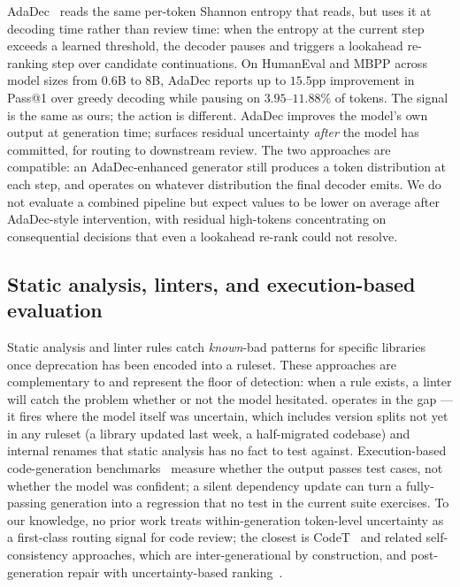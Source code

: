 AdaDec~\cite{adadec2025} reads the same per-token Shannon entropy that
\eps reads, but uses it at decoding time rather than review time: when
the entropy at the current step exceeds a learned threshold, the decoder
pauses and triggers a lookahead re-ranking step over candidate
continuations. On HumanEval and MBPP across model sizes from $0.6$B to
$8$B, AdaDec reports up to $15.5$pp improvement in Pass@1 over greedy
decoding while pausing on $3.95$--$11.88\%$ of tokens. The signal is the
same as ours; the action is different. AdaDec improves the model's own
output at generation time; \eps surfaces residual uncertainty \emph{after}
the model has committed, for routing to downstream review. The two
approaches are compatible: an AdaDec-enhanced generator still produces a
token distribution at each step, and \eps operates on whatever
distribution the final decoder emits. We do not evaluate a combined
pipeline but expect \eps values to be lower on average after AdaDec-style
intervention, with residual high-\eps tokens concentrating on
consequential decisions that even a lookahead re-rank could not resolve.

\subsection{Static analysis, linters, and execution-based evaluation}
\label{subsec:related-static}

Static analysis and linter rules catch \emph{known}-bad patterns for
specific libraries once deprecation has been encoded into a ruleset.
These approaches are complementary to \eps and represent the floor of
detection: when a rule exists, a linter will catch the problem whether
or not the model hesitated. \eps operates in the gap --- it fires where
the model itself was uncertain, which includes version splits not yet in
any ruleset (a library updated last week, a half-migrated codebase) and
internal renames that static analysis has no fact to test against.
Execution-based code-generation benchmarks~\cite{chen2021evaluating,
austin2021program,jimenez2024swebench} measure whether the output passes
test cases, not whether the model was confident; a silent dependency
update can turn a fully-passing generation into a regression that no
test in the current suite exercises. To our knowledge, no prior work
treats within-generation token-level uncertainty as a first-class
routing signal for code review; the closest is CodeT~\cite{chen2022codet}
and related self-consistency approaches, which are inter-generational by
construction, and post-generation repair with uncertainty-based
ranking~\cite{ye2022selfapr}.
